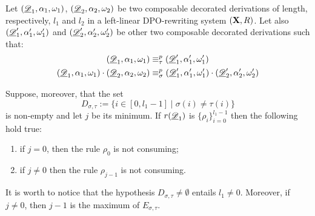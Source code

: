 \begin{lemma}\label{lem:impo}
Let  $(\underline{\mathscr{D}}_1, \alpha_1, \omega_1)$, $(\underline{\mathscr{D}}_2, \alpha_2, \omega_2)$ be two composable decorated derivations of length, respectively, $l_1$ and $l_2$  in a left-linear DPO-rewriting system $(\textbf {\textup{X}},R)$. Let also  $(\underline{\mathscr{D}}'_1, \alpha'_1, \omega'_1)$ and $(\underline{\mathscr{D}}'_2, \alpha'_2, \omega'_2)$ be other two composable decorated derivations such that:
	\begin{align*}(\underline{\mathscr{D}}_1, \alpha_1, \omega_1)&\equiv^p_\tau(\underline{\mathscr{D}}'_1, \alpha'_1, \omega'_1)\\
	(\underline{\mathscr{D}}_1, \alpha_1, \omega_1)\cdot (\underline{\mathscr{D}}_2, \alpha_2, \omega_2)&\equiv^p_\sigma (\underline{\mathscr{D}}'_1, \alpha'_1, \omega'_1)\cdot (\underline{\mathscr{D}}'_2, \alpha'_2, \omega'_2)
	\end{align*}
	
Suppose, moreover, that the set
	\[D_{\sigma, \tau}:=\{i\in [0, l_1-1]\mid \sigma(i)\neq \tau(i)\}\]
	is non-empty and let $j$ be its minimum. If $r(\underline{\mathscr{D}}_1)$ is $\{\rho_i\}_{i=0}^{l_1-1}$ then the following hold true:
	\begin{enumerate}
		\item if $j=0$, then the rule $\rho_0$ is not consuming;
		\item if $j\neq 0$ then the rule $\rho_{j-1}$ is not consuming.
	\end{enumerate}
\end{lemma}
\begin{remark}\label{rem:minmax}It is worth to notice that the hypothesis $D_{\sigma, \tau} \neq \emptyset$ entails $l_1\neq 0$. Moreover, if $j\neq 0$, then $j-1$ is the maximum of $E_{\sigma, \tau}$.
\end{remark}
